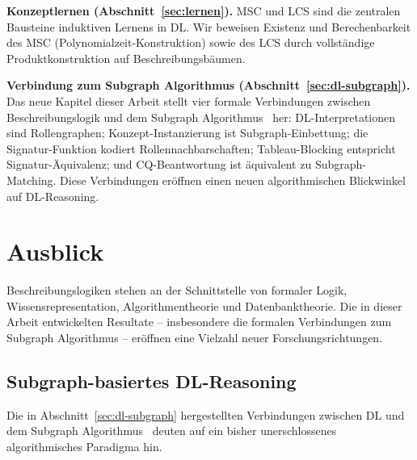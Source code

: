 ﻿\documentclass[a4paper,12pt]{article}
\theoremstyle{definition}
\theoremstyle{plain}
\theoremstyle{remark}
\begin{document}
\textbf{Konzeptlernen (Abschnitt~\ref{sec:lernen}).}
MSC und LCS sind die zentralen Bausteine induktiven Lernens in DL.
Wir beweisen Existenz und Berechenbarkeit des MSC (Polynomialzeit-Konstruktion)
sowie des LCS durch vollst{\"a}ndige Produktkonstruktion auf Beschreibungsb{\"a}umen.

\textbf{Verbindung zum Subgraph Algorithmus (Abschnitt~\ref{sec:dl-subgraph}).}
Das neue Kapitel dieser Arbeit stellt vier formale Verbindungen
zwischen Beschreibungslogik und dem Subgraph Algorithmus~\cite{Epp2026} her:
DL-Interpretationen sind Rollengraphen; Konzept-Instanzierung ist
Subgraph-Einbettung; die Signatur-Funktion kodiert Rollennachbarschaften;
Tableau-Blocking entspricht Signatur-{\"A}quivalenz;
und CQ-Beantwortung ist {\"a}quivalent zu Subgraph-Matching.
Diese Verbindungen er{\"o}ffnen einen neuen algorithmischen Blickwinkel
auf DL-Reasoning.

\section{Ausblick}
\label{sec:ausblick}

Beschreibungslogiken stehen an der Schnittstelle von formaler Logik,
Wissensrepresentation, Algorithmentheorie und Datenbanktheorie.
Die in dieser Arbeit entwickelten Resultate -- insbesondere die
formalen Verbindungen zum Subgraph Algorithmus -- er{\"o}ffnen
eine Vielzahl neuer Forschungsrichtungen.

\subsection{Subgraph-basiertes DL-Reasoning}

Die in Abschnitt~\ref{sec:dl-subgraph} hergestellten Verbindungen
zwischen DL und dem Subgraph Algorithmus~\cite{Epp2026} deuten
auf ein bisher unerschlossenes algorithmisches Paradigma hin.
\end{document}
